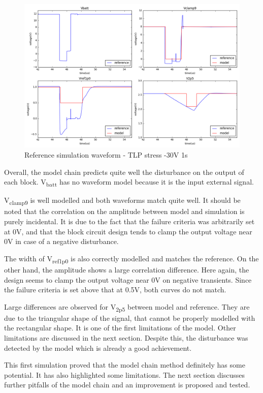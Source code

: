 \begin{figure}[!h]
  \centering
  \includegraphics[width=\textwidth]{src/4/figures/total_simulation_30V_1u.png}
  \caption{Reference simulation waveform - TLP stress -30V 1\textmugreek{}s }
  \label{fig:reference_simu}
\end{figure}

Overall, the model chain predicts quite well the disturbance on the output of each block.
V\textsubscript{batt} has no waveform model because it is the input external signal.

V\textsubscript{clamp9} is well modelled and both waveforms match quite well.
It should be noted that the correlation on the amplitude between model and simulation is purely incidental.
It is due to the fact that the failure criteria was arbitrarily set at 0V, and that the block circuit design tends to clamp the output voltage near 0V in case of a negative disturbance.

The width of V\textsubscript{ref1p0} is also correctly modelled and matches the reference.
On the other hand, the amplitude shows a large correlation difference.
Here again, the design seems to clamp the output voltage near 0V on negative transients.
Since the failure criteria is set above that at 0.5V, both curves do not match.

Large differences are observed for V\textsubscript{2p5} between model and reference.
They are due to the triangular shape of the signal, that cannot be properly modelled with the rectangular shape.
It is one of the first limitations of the model.
Other limitations are discussed in the next section.
Despite this, the disturbance was detected by the model which is already a good achievement.

This first simulation proved that the model chain method definitely has some potential.
It has also highlighted some limitations.
The next section discusses further pitfalls of the model chain and an improvement is proposed and tested.
